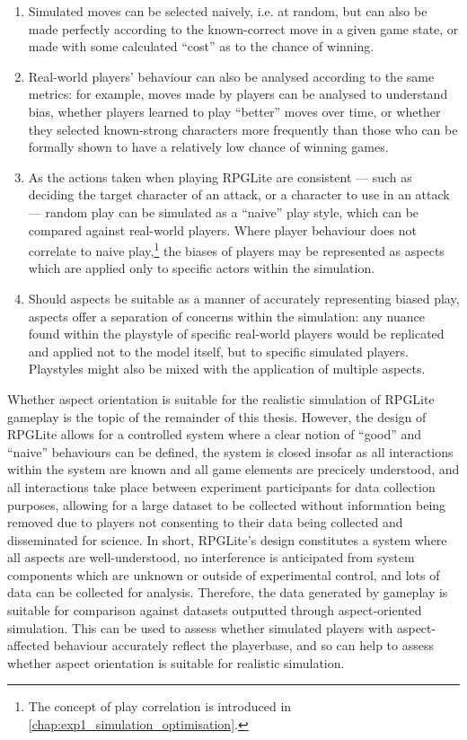 \begin{enumerate} \item Simulated moves can be selected naively, i.e. at random,
but can also be made perfectly according to the known-correct move in a given
game state, or made with some calculated ``cost'' as to the chance of winning.
\item Real-world players' behaviour can also be analysed according to the same
metrics: for example, moves made by players can be analysed to understand bias,
whether players learned to play ``better'' moves over time, or whether they
selected known-strong characters more frequently than those who can be formally
shown to have a relatively low chance of winning games.  \item As the actions
taken when playing RPGLite are consistent --- such as deciding the target
character of an attack, or a character to use in an attack --- random play can
be simulated as a ``naive'' play style, which can be compared against real-world
players. Where player behaviour does not correlate to naive play,\footnote{The
concept of play correlation is introduced in
\cref{chap:exp1_simulation_optimisation}.} the biases of players may be
represented as aspects which are applied only to specific actors within the
simulation.  \item Should aspects be suitable as a manner of accurately
representing biased play, aspects offer a separation of concerns within the
simulation: any nuance found within the playstyle of specific real-world players
would be replicated and applied not to the model itself, but to specific
simulated players. Playstyles might also be mixed with the application of
multiple aspects.  \end{enumerate}

Whether aspect orientation is suitable for the realistic simulation of RPGLite
gameplay is the topic of the remainder of this thesis. However, the design of
RPGLite allows for a controlled system where a clear notion of ``good'' and
``naive'' behaviours can be defined, the system is closed insofar as all
interactions within the system are known and all game elements are precicely
understood, and all interactions take place between experiment participants for
data collection purposes, allowing for a large dataset to be collected without
information being removed due to players not consenting to their data being
collected and disseminated for science. In short, RPGLite's design constitutes a
system where all aspects are well-understood, no interference is anticipated
from system components which are unknown or outside of experimental control, and
lots of data can be collected for analysis. Therefore, the data generated by
gameplay is suitable for comparison against datasets outputted through
aspect-oriented simulation. This can be used to assess whether simulated players
with aspect-affected behaviour accurately reflect the playerbase, and so can
help to assess whether aspect orientation is suitable for realistic simulation.

